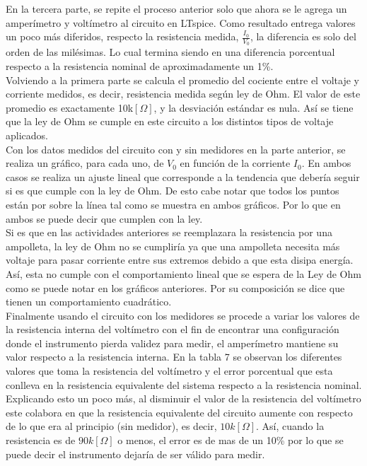 \documentclass[letterpaper,11pt]{article} %
\begin{document}
En la tercera parte, se repite el proceso anterior solo que ahora se le agrega un amperímetro y voltímetro al circuito en LTspice. Como resultado entrega valores un poco más diferidos, respecto la resistencia medida, $\frac{I_0}{V_0}$, la diferencia es solo del orden de las milésimas. Lo cual termina siendo en una diferencia porcentual respecto a la resistencia nominal de aproximadamente un 1\%.\\

Volviendo a la primera parte se calcula el promedio del cociente entre el voltaje y corriente medidos, es decir, resistencia medida según ley de Ohm. El valor de este promedio es exactamente 10k$[\Omega]$, y la desviación estándar es nula. Así se tiene que la ley de Ohm se cumple en este circuito a los distintos tipos de voltaje aplicados.\\

Con los datos medidos del circuito con y sin medidores en la parte anterior, se realiza un gráfico, para cada uno, de $V_0$ en función de la corriente $I_0$. En ambos casos se realiza un ajuste lineal que corresponde a la tendencia que debería seguir si es que cumple con la ley de Ohm. De esto cabe notar que todos los puntos están por sobre la línea tal como se muestra en ambos gráficos. Por lo que en ambos se puede decir que cumplen con la ley.\\

Si es que en las actividades anteriores se reemplazara la resistencia por una ampolleta, la ley de Ohm no se cumpliría ya que una ampolleta necesita más voltaje para pasar corriente entre sus extremos debido a que esta disipa energía. Así, esta no cumple con el comportamiento lineal que se espera de la Ley de Ohm como se puede notar en los gráficos anteriores. Por su composición se dice que tienen un comportamiento cuadrático.\\

Finalmente usando el circuito con los medidores se procede a variar los valores de la resistencia interna del voltímetro con el fin de encontrar una configuración donde el instrumento pierda validez para medir, el amperímetro mantiene su valor respecto a la resistencia interna. En la tabla 7 se observan los diferentes valores que toma la resistencia del voltímetro y el error porcentual que esta conlleva en la resistencia equivalente del sistema respecto a la resistencia nominal. Explicando esto un poco más, al disminuir el valor de la resistencia del voltímetro este colabora en que la resistencia equivalente del circuito aumente con respecto de lo que era al principio (sin medidor), es decir, $10k[\Omega]$. Así, cuando la resistencia es de $90k[\Omega]$ o menos, el error es de mas de un 10\% por lo que se puede decir el instrumento dejaría de ser válido para medir. \\
\end{document}
